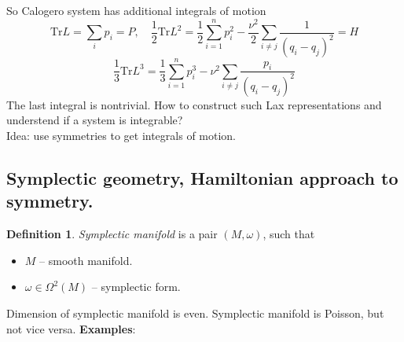 \documentclass[12pt]{article}
\theoremstyle{definition}
\newtheorem{defin}{Definition}[]
\begin{document}
So Calogero system has additional integrals of motion
\begin{equation}
    \text{Tr} L=\sum\limits_ip_i=P,\quad\frac{1}{2}\text{Tr}L^2=\frac{1}{2}\sum\limits_{i=1}^np_i^2-\frac{\nu^2}{2}\sum\limits_{i\neq j}\frac{1}{(q_i-q_j)^2}=H
\end{equation}
\begin{equation}
    \frac{1}{3}\text{Tr}L^3=\frac{1}{3}\sum\limits_{i=1}^np_i^3-\nu^2\sum\limits_{i\neq j}\frac{p_i}{(q_i-q_j)^2}
\end{equation}
The last integral is nontrivial. How to construct such Lax representations and understend if a system is integrable?\\
Idea: use symmetries to get integrals of motion.
\subsection*{Symplectic geometry, Hamiltonian approach to symmetry.}
\begin{defin}
    \textit{Symplectic manifold} is a pair $(M,\omega)$, such that
    \begin{itemize}
        \item $M$ -- smooth manifold.
        \item $\omega\in\Omega^2(M)$ -- symplectic form.
    \end{itemize}
\end{defin}
Dimension of symplectic manifold is even. Symplectic manifold is Poisson, but not vice versa.
\textbf{Examples}:
\end{document}
